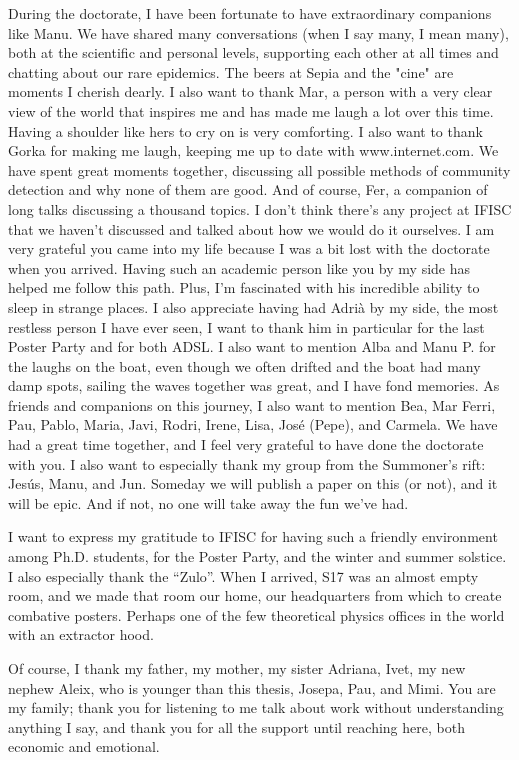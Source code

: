 During the doctorate, I have been fortunate to have extraordinary companions like Manu. We have shared many conversations (when I say many, I mean many), both at the scientific and personal levels, supporting each other at all times and chatting about our rare epidemics. The beers at Sepia and the "cine" are moments I cherish dearly. I also want to thank Mar, a person with a very clear view of the world that inspires me and has made me laugh a lot over this time. Having a shoulder like hers to cry on is very comforting. I also want to thank Gorka for making me laugh, keeping me up to date with www.internet.com. We have spent great moments together, discussing all possible methods of community detection and why none of them are good. And of course, Fer, a companion of long talks discussing a thousand topics. I don't think there's any project at IFISC that we haven't discussed and talked about how we would do it ourselves. I am very grateful you came into my life because I was a bit lost with the doctorate when you arrived. Having such an academic person like you by my side has helped me follow this path. Plus, I'm fascinated with his incredible ability to sleep in strange places. I also appreciate having had Adrià by my side, the most restless person I have ever seen, I want to thank him in particular for the last Poster Party and for both ADSL. I also want to mention Alba and Manu P. for the laughs on the boat, even though we often drifted and the boat had many damp spots, sailing the waves together was great, and I have fond memories. As friends and companions on this journey, I also want to mention Bea, Mar Ferri, Pau, Pablo, Maria, Javi, Rodri, Irene, Lisa, José (Pepe), and Carmela. We have had a great time together, and I feel very grateful to have done the doctorate with you. I also want to especially thank my group from the Summoner's rift: Jesús, Manu, and Jun. Someday we will publish a paper on this (or not), and it will be epic. And if not, no one will take away the fun we've had.



I want to express my gratitude to IFISC for having such a friendly environment among Ph.D. students, for the Poster Party, and the winter and summer solstice. I also especially thank the ``Zulo''. When I arrived, S17 was an almost empty room, and we made that room our home, our headquarters from which to create combative posters. Perhaps one of the few theoretical physics offices in the world with an extractor hood.

Of course, I thank my father, my mother, my sister Adriana, Ivet, my new nephew Aleix, who is younger than this thesis, Josepa, Pau, and Mimi. You are my family; thank you for listening to me talk about work without understanding anything I say, and thank you for all the support until reaching here, both economic and emotional.

